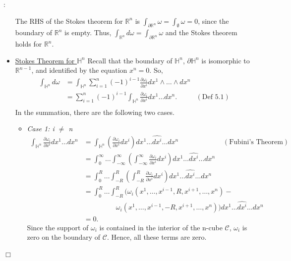 \documentclass{article}
\def\endproofmark{$\Box$}
\newenvironment{proof}{\par\noindent{\bf Proof}:}{\endproofmark\smallskip}
\begin{document}
\begin{proof}
\begin{itemize}
        The RHS of the Stokes theorem for $\mathbb{R}^n$ is $\int_{\partial \mathbb{R}^n} \omega = \int_{\emptyset} \omega = 0$, since the boundary of $\mathbb{R}^n$ is empty. Thus, $\int_{\mathbb{R}^n} d\omega = \int_{\partial \mathbb{R}^n} \omega $ and the Stokes theorem holds for $\mathbb{R}^n$.
        \item \underline{Stokes Theorem for $\mathbb{H}^n$}
        Recall that the boundary of $\mathbb{H}^n$, $\partial \mathbb{H}^n$ is isomorphic to $\mathbb{R}^{n-1}$, and identified by the equation $x^n = 0$. So, 
        \begin{align*}
            \int_{\mathbb{H}^n} d\omega &= \int_{\mathbb{H}^n} \sum_{i=1}^n (-1)^{i-1} \frac{\partial \omega_i}{\partial x^i} dx^1 \wedge \ldots \wedge dx^n \\
            &= \sum_{i=1}^n (-1)^{i-1} \int_{\mathbb{H}^n}   \frac{\partial \omega_i}{\partial x^i} dx^1 \ldots dx^n . & (\text{Def 5.1}) \\
        \end{align*}
        In the summation, there are the following two cases.
        \begin{itemize}
            \item \emph{Case 1: i $\neq$ n}
            \begin{align*}
                \int_{\mathbb{H}^n}   \frac{\partial \omega_i}{\partial x^i} dx^1 \ldots dx^n &= \int_{\mathbb{H}^n}  \left( \frac{\partial \omega_i}{\partial x^i} dx^i \right) dx^1 \ldots \widehat{dx^i} \ldots dx^n \ \ \ \ \ \ \ \ \ \ \ \ \ \ \ \ \ \ \ \ \ \ \ \ \ \ \ \ \ (\text{Fubini's Theorem})\\
                &=\int_{0}^{\infty} \ldots \int_{-\infty}^{\infty} \left(\int_{-\infty}^{\infty} \frac{\partial \omega_i}{\partial x^i} dx^i\right) dx^1 \ldots \widehat{dx^i} \ldots dx^n \\
                &= \int_{0}^{R} \ldots \int_{-R}^{R} \left(\int_{-R}^{R} \frac{\partial \omega_i}{\partial x^i} dx^i\right) dx^1 \ldots \widehat{dx^i} \ldots dx^n \\
                &= \int_{0}^{R} \ldots \int_{-R}^{R} (\omega_i(x^1, \ldots, x^{i-1}, R, x^{i+1}, \ldots, x^n) - \\
                & \ \ \ \ \ \ \ \ \ \ \ \  \ \ \ \ \ \ \ \ \ \omega_i(x^1, \ldots, x^{i-1}, -R, x^{i+1}, \ldots, x^n)) dx^1 \ldots \widehat{dx^i} \ldots dx^n \\
                &= 0.
            \end{align*}
            Since the support of $\omega_i$ is contained in the interior of the n-cube $\mathcal{C}$, $\omega_i$ is zero on the boundary of $\mathcal{C}$. Hence, all these terms are zero.  

\end{itemize}
\end{itemize}
\end{proof}
\end{document}
